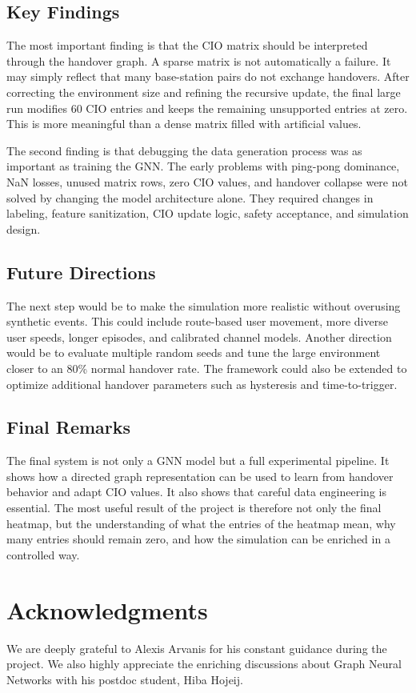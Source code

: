 \documentclass[11pt,a4paper]{article}
\begin{document}
\subsection{Key Findings}
The most important finding is that the CIO matrix should be interpreted through the handover graph. A sparse matrix is not automatically a failure. It may simply reflect that many base-station pairs do not exchange handovers. After correcting the environment size and refining the recursive update, the final large run modifies 60 CIO entries and keeps the remaining unsupported entries at zero. This is more meaningful than a dense matrix filled with artificial values.

The second finding is that debugging the data generation process was as important as training the GNN. The early problems with ping-pong dominance, NaN losses, unused matrix rows, zero CIO values, and handover collapse were not solved by changing the model architecture alone. They required changes in labeling, feature sanitization, CIO update logic, safety acceptance, and simulation design.

\subsection{Future Directions}
The next step would be to make the simulation more realistic without overusing synthetic events. This could include route-based user movement, more diverse user speeds, longer episodes, and calibrated channel models. Another direction would be to evaluate multiple random seeds and tune the large environment closer to an 80\% normal handover rate. The framework could also be extended to optimize additional handover parameters such as hysteresis and time-to-trigger.

\subsection{Final Remarks}
The final system is not only a GNN model but a full experimental pipeline. It shows how a directed graph representation can be used to learn from handover behavior and adapt CIO values. It also shows that careful data engineering is essential. The most useful result of the project is therefore not only the final heatmap, but the understanding of what the entries of the heatmap mean, why many entries should remain zero, and how the simulation can be enriched in a controlled way.

\section*{Acknowledgments}
We are deeply grateful to Alexis Arvanis for his constant guidance during the project. We also highly appreciate the enriching discussions about Graph Neural Networks with his postdoc student, Hiba Hojeij.
\end{document}
